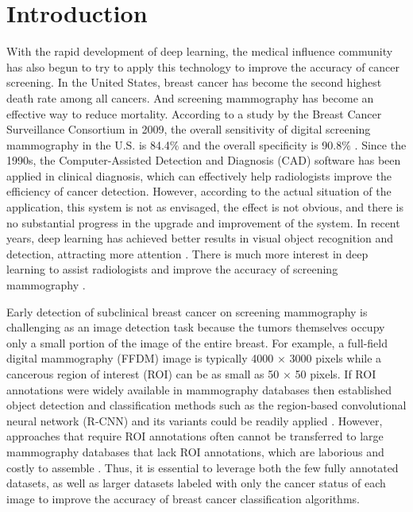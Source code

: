 \section{Introduction}
\label{sec:Intro}

With the rapid development of deep learning, 
the medical influence community has also begun 
to try to apply this technology to improve the 
accuracy of cancer screening.
In the United States, breast cancer has become 
the second highest death rate among all cancers.
And screening mammography has become an 
effective way to reduce mortality.
According to a study by the Breast Cancer 
Surveillance Consortium in 2009, the overall 
sensitivity of digital screening mammography 
in the U.S. is 84.4$\%$ and the overall 
specificity is 90.8$\%$
\cite{Oeffinger2015}.  
Since the 1990s, the Computer-Assisted Detection 
and Diagnosis (CAD) software has been applied 
in clinical diagnosis, which can effectively 
help radiologists improve the efficiency of 
cancer detection. 
However, according to the actual situation 
of the application, this system is not as 
envisaged, the effect is not obvious, and 
there is no substantial progress in the 
upgrade and improvement of the system.
In recent years, deep learning has achieved 
better results in visual object recognition 
and detection, attracting more attention
\cite{Lecun2015}.
There is much more interest in deep learning 
to assist radiologists and improve the accuracy 
of screening mammography
\cite{Jamieson2012,Zhu2019,Shen2017}. 

Early detection of subclinical breast cancer 
on screening mammography is challenging as an 
image detection task because the tumors 
themselves occupy only a small portion of the 
image of the entire breast. 
For example, a full-field digital mammography 
(FFDM) image is typically 4000 × 3000 pixels 
while a cancerous region of interest (ROI) 
can be as small as 50 × 50 pixels. 
If ROI annotations were widely available in 
mammography databases then established object 
detection and classification methods such as 
the region-based convolutional neural network 
(R-CNN) and its variants could be readily 
applied
\cite{Girshick2014,Girshick2015,Ren2017}.
However, approaches that require ROI 
annotations often cannot be transferred to large mammography 
databases that lack ROI annotations, which are
laborious and costly to assemble
\cite{Dai2016}. 
Thus, it is essential to leverage both the few 
fully annotated datasets, as well as larger 
datasets labeled with only the cancer status 
of each image to improve the accuracy 
of breast cancer classification algorithms.

